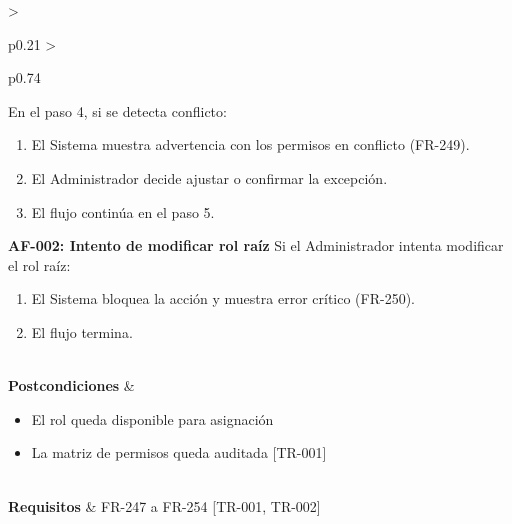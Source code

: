 \begin{longtable}{>{\raggedright\arraybackslash}p{0.21\textwidth} >{\raggedright\arraybackslash}p{0.74\textwidth}}
{\newline
En el paso 4, si se detecta conflicto:
\begin{enumerate}[leftmargin=1.5em, nosep, topsep=0pt]
\item El Sistema muestra advertencia con los permisos en conflicto (FR-249).
\item El Administrador decide ajustar o confirmar la excepción.
\item El flujo continúa en el paso 5.
\end{enumerate}
\vspace{4pt}\noindent\textbf{AF-002: Intento de modificar rol raíz}
\newline
Si el Administrador intenta modificar el rol raíz:
\begin{enumerate}[leftmargin=1.5em, nosep, topsep=0pt]
\item El Sistema bloquea la acción y muestra error crítico (FR-250).
\item El flujo termina.
\end{enumerate} \vspace{2pt}} \\
\textbf{Postcondiciones} & \parbox[t]{\linewidth}{\vspace{2pt} \begin{itemize}[leftmargin=1.5em, nosep, topsep=0pt]
\item El rol queda disponible para asignación
\item La matriz de permisos queda auditada [TR-001]
\end{itemize} \vspace{2pt}} \\
\textbf{Requisitos} & FR-247 a FR-254 [TR-001, TR-002] \\ \bottomrule
\end{longtable}\normalsize\vspace{1em}